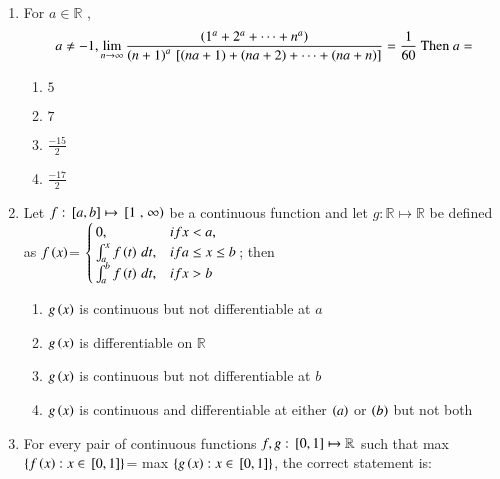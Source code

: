 \documentclass[journal]{IEEEtran}
\numberwithin{equation}{enumi}
\numberwithin{figure}{enumi}
\begin{document}
\begin{enumerate}
    \item 
	    For $a\in \mathbb{R}$ , 
    \begin{align*}
	    a\neq -1, \lim_{n\to\infty}\frac{\left(1^a+2^a+\cdots+n^a\right)}{\left(n+1\right)^a{}\left[\left(na+1\right)+\left(na+2\right)+\cdots+\left(na+n\right)\right]}
	    =\frac{1}{60} \text{ Then } a=
    \end{align*}

    \hfill{}
    
    \begin{multicols}{4}
    \begin{enumerate}
        \item $5$
        \item $7$ 
        \item $\frac{-15}{2}$ 
        \item $\frac{-17}{2}$ 
    \end{enumerate}
    \end{multicols}


    \item 
    Let $f: {}\left[a,b\right]\mapsto {}\left[1\right.,\left.\infty\right)$ be a continuous function and let $g: \mathbb{R}\mapsto \mathbb{R}$ be defined as 
    $f\left(x\right)$= 
    $\begin{cases}
       0, & if x<a, \\
       \int_{a}^{x}{f\left(t\right) \, dt}, & if a\leq x\leq b \\
       \int_{a}^{b}{f\left(t\right) \, dt}, & if x>b
    \end{cases}$; then 

    \hfill{}
    
    \begin{enumerate}
        \item $g\left(x\right)$ is continuous but not differentiable at $a$
        \item $g\left(x\right)$ is differentiable on $\mathbb{R}$
        \item $g\left(x\right)$ is continuous but not differentiable at $b$
        \item $g\left(x\right)$ is continuous and differentiable at either $\left(a\right)$ or $\left(b\right)$ but not both 
    \end{enumerate}


    \item 
	  For every pair of continuous functions $f, g: {}\left[0, 1\right]\mapsto \mathbb{R}$ such that max $\left\{f\left(x\right): x\in {}\left[0, 1\right]\right\}$= max $\left\{g\left(x\right): x\in {}\left[0, 1\right]\right\}$, the correct statement is: 
    

\end{enumerate}
\end{document}
